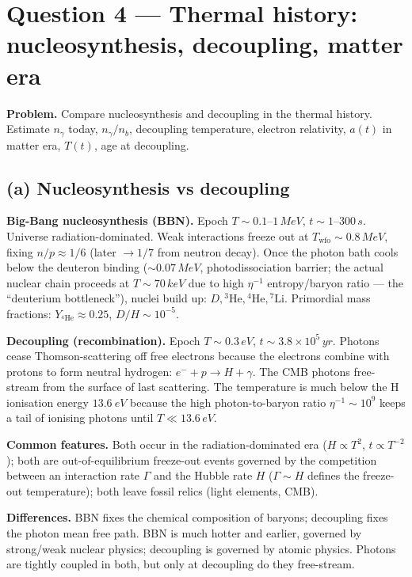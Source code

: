\documentclass[11pt]{article}
\begin{document}
\section*{Question 4 --- Thermal history: nucleosynthesis, decoupling, matter era}

\textbf{Problem.} Compare nucleosynthesis and decoupling in the thermal history. Estimate $n_\gamma$ today, $n_\gamma/n_b$, decoupling temperature, electron relativity, $a(t)$ in matter era, $T(t)$, age at decoupling.

\subsection*{(a) Nucleosynthesis vs decoupling}

\textbf{Big-Bang nucleosynthesis (BBN).} Epoch $T\sim 0.1\text{--}1\,\si{MeV}$, $t\sim 1\text{--}300\,\si{s}$. Universe radiation-dominated. Weak interactions freeze out at $T_\text{wfo}\sim 0.8\,\si{MeV}$, fixing $n/p\approx 1/6$ (later $\to 1/7$ from neutron decay). Once the photon bath cools below the deuteron binding ($\sim\!0.07\,\si{MeV}$, photodissociation barrier; the actual nuclear chain proceeds at $T\sim 70\,\si{keV}$ due to high $\eta^{-1}$ entropy/baryon ratio --- the ``deuterium bottleneck''), nuclei build up: $D, {}^3\text{He}, {}^4\text{He}, {}^7\text{Li}$. Primordial mass fractions: $Y_{\!^4\text{He}}\approx 0.25$, $D/H\sim 10^{-5}$.

\textbf{Decoupling (recombination).} Epoch $T\sim 0.3\,\si{eV}$, $t\sim 3.8\times 10^5\,\si{yr}$. Photons cease Thomson-scattering off free electrons because the electrons combine with protons to form neutral hydrogen: $e^- + p\to H + \gamma$. The CMB photons free-stream from the surface of last scattering. The temperature is much below the H ionisation energy $\SI{13.6}{eV}$ because the high photon-to-baryon ratio $\eta^{-1}\sim 10^9$ keeps a tail of ionising photons until $T\ll 13.6\,\si{eV}$.

\textbf{Common features.} Both occur in the radiation-dominated era ($H\propto T^2$, $t\propto T^{-2}$); both are out-of-equilibrium freeze-out events governed by the competition between an interaction rate $\Gamma$ and the Hubble rate $H$ ($\Gamma\sim H$ defines the freeze-out temperature); both leave fossil relics (light elements, CMB).

\textbf{Differences.} BBN fixes the chemical composition of baryons; decoupling fixes the photon mean free path. BBN is much hotter and earlier, governed by strong/weak nuclear physics; decoupling is governed by atomic physics. Photons are tightly coupled in both, but only at decoupling do they free-stream.
\end{document}
